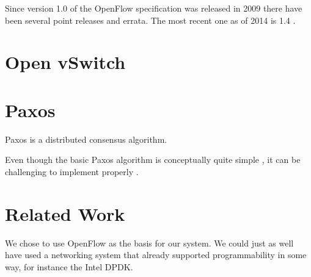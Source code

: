 Since version 1.0 of the OpenFlow specification was
released in 2009 there have been several point releases and errata.  The
most recent one as of 2014 is 1.4
\cite{openflow-1.0,openflow-1.0.1,openflow-1.0.2,openflow-1.1,openflow-1.2,openflow-1.3,openflow-1.4}.


\section{Open vSwitch}
\label{chapter:background.openvswitch}

\section{Paxos}
\label{chapter:background.paxos}

Paxos is a distributed consensus algorithm.

Even though the basic Paxos algorithm is conceptually quite simple
\cite{Lam01}, it can be challenging to implement properly
\cite{Chandra:2007:PML:1281100.1281103}.

\section{Related Work}
\label{chapter:related.work}


We chose to use OpenFlow as the basis for our system.
We could just as well have used a networking system that already supported
programmability in some way, for instance the Intel DPDK.
